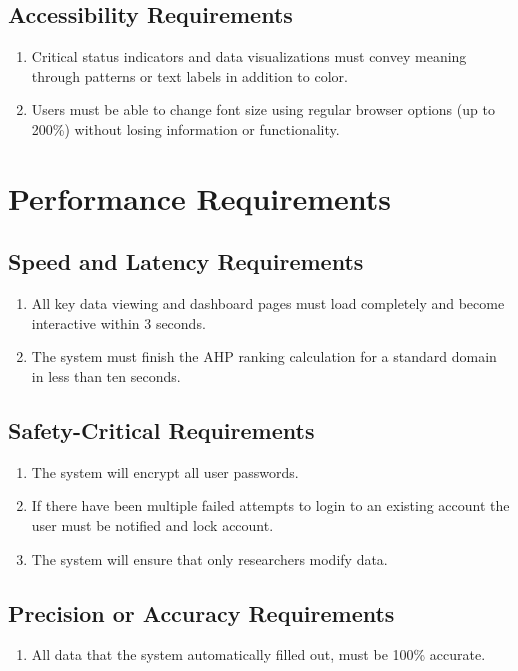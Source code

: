 \documentclass[12pt]{article}
\begin{document}
\subsection{Accessibility Requirements}
\begin{enumerate}[label=\thesubsection-\arabic*]
  \item Critical status indicators and data visualizations must convey meaning through patterns or text labels in addition to color.
  \item Users must be able to change font size using regular browser options (up to 200\%) without losing information or functionality.
\end{enumerate}

\section{Performance Requirements}
\subsection{Speed and Latency Requirements}
\begin{enumerate}[label=\thesubsection-\arabic*]
  \item All key data viewing and dashboard pages must load completely and become interactive within 3 seconds.
  \item The system must finish the AHP ranking calculation for a standard domain in less than ten seconds.
\end{enumerate}
\subsection{Safety-Critical Requirements}
\begin{enumerate}[label=\thesubsection-\arabic*]
  \item The system will encrypt all user passwords.
  \item If there have been multiple failed attempts to login to an existing account the user must be notified and lock account.
  \item The system will ensure that only researchers modify data.
\end{enumerate}\subsection{Precision or Accuracy Requirements}
\begin{enumerate}[label=\thesubsection-\arabic*]
  \item All data  that the system automatically filled out, must be 100\% accurate.
\end{enumerate}
\end{document}
